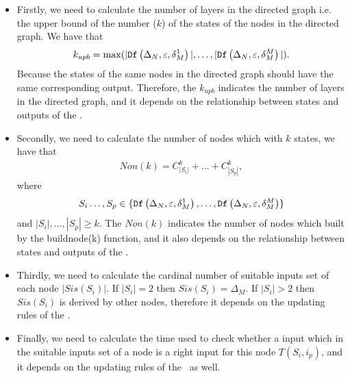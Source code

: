 \begin{itemize}
\item Firstly, we need to calculate the number of layers in the directed graph i.e. the upper bound of the number ($k$) of the states of the nodes in the directed graph. We have that 
\begin{equation}
\begin{split}
k_{upb}= \max(|{\tt Df}\left(\Delta_N,\varepsilon,\delta_M^1\right)|,\ldots,|{\tt Df}\left(\Delta_N,\varepsilon,\delta_M^M\right)|).
\end{split}
\end{equation}
Because the states of the same nodes in the directed graph should have the same corresponding output. Therefore, the $k_{upb}$ indicates the number of layers in the directed graph, and it depends on the relationship between states and outputs of the \BCNs.

\item Secondly, we need to calculate the number of nodes which with $k$ states, we have that
\begin{equation}
\begin{split}
Non(k)= C_{|S_i|}^k+\ldots +C_{|S_p|}^k,
\end{split}
\end{equation}
where \[S_i\ldots,S_p\in\{{\tt Df}\left(\Delta_N,\varepsilon,\delta_M^1\right),\ldots,{\tt Df}\left(\Delta_N,\varepsilon,\delta_M^M\right)\}\] and $|S_i|,\ldots,|S_p|\ge k$. The $Non(k)$ indicates the number of nodes which built by the {\sf buildnode}(k) function, and it also depends on the relationship between states and outputs of the \BCNs.

\item Thirdly, we need to calculate the cardinal number of suitable inputs set of each node $|Sis(S_i)|$. If $|S_i|=2$ then $Sis(S_i)=\Delta_M$. If $|S_i|>2$ then $Sis(S_i)$ is derived by other nodes, therefore it depends on the updating rules of the \BCNs.

\item Finally, we need to calculate the time used to check whether a input which in the suitable inputs set of a node is a right input for this node $T(S_i, i_p)$, and it depends on the updating rules of the \BCNs\ as well.
 \end{itemize}

